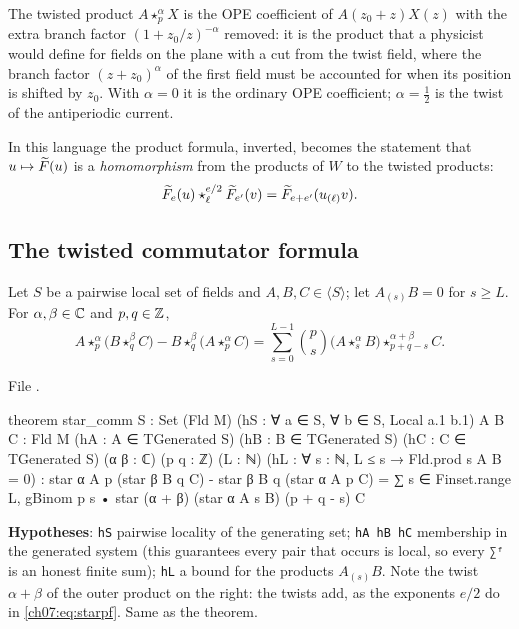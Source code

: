 \begin{physics}
The twisted product $A\star^\alpha_pX$ is the OPE coefficient of $A(z_0+z)X(z)$ with the extra branch factor $(1+z_0/z)^{-\alpha}$ removed: it is the product that a physicist would define for fields on the plane with a cut from the twist field, where the branch factor $(z+z_0)^{\alpha}$ of the first field must be accounted for when its position is shifted by $z_0$. With $\alpha=0$ it is the ordinary OPE coefficient; $\alpha=\tfrac12$ is the twist of the antiperiodic current.
\end{physics}

In this language the product formula, inverted, becomes the statement that $u\mapsto
\widetilde{F}(u)$ is a \emph{homomorphism} from the products of $W$ to the twisted products:
\begin{equation}\label{ch07:eq:starpf}
  \widetilde{F}_e(u)\star^{e/2}_{\ell}\widetilde{F}_{e'}(v) = \widetilde{F}_{e+e'}(u_{(\ell)}v).
\end{equation}

\subsection{The twisted commutator formula}

\begin{theorem}\label{ch07:thm:starcomm}
Let $S$ be a pairwise local set of fields and $A,B,C\in\langle S\rangle$; let $A_{(s)}B = 0$ for
$s\ge L$. For $\alpha,\beta\in{\mathbb{C}}$ and $p,q\in{\mathbb{Z}}$,
\begin{equation*}
  A\star^\alpha_p\bigl(B\star^\beta_qC\bigr) - B\star^\beta_q\bigl(A\star^\alpha_pC\bigr)
  = \sum_{s=0}^{L-1}\binom ps\bigl(A\star^\alpha_sB\bigr)\star^{\alpha+\beta}_{p+q-s}C .
\end{equation*}
\end{theorem}

\noindent File .
\begin{leancode}
theorem star_comm {S : Set (Fld M)} (hS : ∀ a ∈ S, ∀ b ∈ S, Local a.1 b.1) {A B C : Fld M}
    (hA : A ∈ TGenerated S) (hB : B ∈ TGenerated S) (hC : C ∈ TGenerated S) (α β : ℂ)
    (p q : ℤ) (L : ℕ) (hL : ∀ s : ℕ, L ≤ s → Fld.prod s A B = 0) :
    star α A p (star β B q C) - star β B q (star α A p C)
      = ∑ s ∈ Finset.range L, gBinom p s • star (α + β) (star α A s B) (p + q - s) C
\end{leancode}

\begin{dictionary}
\textbf{Hypotheses}: \verb|hS| pairwise locality of the generating set; \verb|hA hB hC|
membership in the generated system (this guarantees every pair that occurs is local, so every
\verb|∑ᶠ| is an honest finite sum); \verb|hL| a bound for the products $A_{(s)}B$. Note the
twist $\alpha+\beta$ of the outer product on the right: the twists add, as the exponents
$e/2$ do in \eqref{ch07:eq:starpf}. Same as the theorem.
\end{dictionary}

